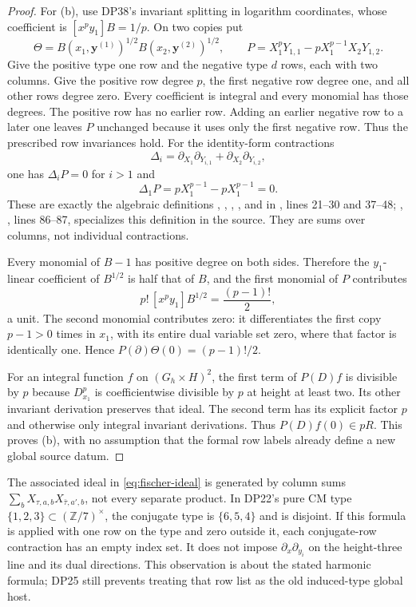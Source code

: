 \documentclass[11pt,a4paper]{article}
\theoremstyle{definition}\newtheorem{remark}[theorem]{Remark}
\newcommand{\Z}{\mathbb Z}\newcommand{\Q}{\mathbb Q}\newcommand{\F}{\mathbb F}
\begin{document}
\begin{proof}
For (b), use DP38's invariant splitting in logarithm coordinates, whose coefficient is $[x^py_1]B=1/p$. On two copies put
\[
 \Theta=B(x_1,\mathbf y^{(1)})^{1/2}B(x_2,\mathbf y^{(2)})^{1/2},\qquad
 P=X_1^pY_{1,1}-pX_1^{p-1}X_2Y_{1,2}.
\]
Give the positive type one row and the negative type $d$ rows, each with two columns. Give the positive row degree $p$, the first negative row degree one, and all other rows degree zero. Every coefficient is integral and every monomial has those degrees. The positive row has no earlier row. Adding an earlier negative row to a later one leaves $P$ unchanged because it uses only the first negative row. Thus the prescribed row invariances hold. For the identity-form contractions
\[
 \Delta_i=\partial_{X_1}\partial_{Y_{i,1}}+
          \partial_{X_2}\partial_{Y_{i,2}},
\]
one has $\Delta_iP=0$ for $i>1$ and
\[
 \Delta_1P=pX_1^{p-1}-pX_1^{p-1}=0.
\]
These are exactly the algebraic definitions , , , , and  in
,
lines 21--30 and 37--48; , , lines 86--87, specializes this definition in the source. They are sums over columns, not individual contractions.

Every monomial of $B-1$ has positive degree on both sides. Therefore the $y_1$-linear coefficient of $B^{1/2}$ is half that of $B$, and the first monomial of $P$ contributes
\[
 p!\,[x^py_1]B^{1/2}=\frac{(p-1)!}{2},
\]
a unit. The second monomial contributes zero: it differentiates the first copy $p-1>0$ times in $x_1$, with its entire dual variable set zero, where that factor is identically one. Hence $P(\partial)\Theta(0)=(p-1)!/2$.

For an integral function $f$ on $(G_h\times H)^2$, the first term of $P(D)f$ is divisible by $p$ because $D_{x_1}^p$ is coefficientwise divisible by $p$ at height at least two. Its other invariant derivation preserves that ideal. The second term has its explicit factor $p$ and otherwise only integral invariant derivations. Thus $P(D)f(0)\in pR$. This proves (b), with no assumption that the formal row labels already define a new global source datum.
\end{proof}

The associated ideal in \eqref{eq:fischer-ideal} is generated by column sums $\sum_bX_{\tau,a,b}X_{\bar\tau,a',b}$, not every separate product. In DP22's pure CM type $\{1,2,3\}\subset(\Z/7)^\times$, the conjugate type is $\{6,5,4\}$ and is disjoint. If this formula is applied with one row on the type and zero outside it, each conjugate-row contraction has an empty index set. It does not impose $\partial_x\partial_{y_i}$ on the height-three line and its dual directions. This observation is about the stated harmonic formula; DP25 still prevents treating that row list as the old induced-type global host.
\end{document}
